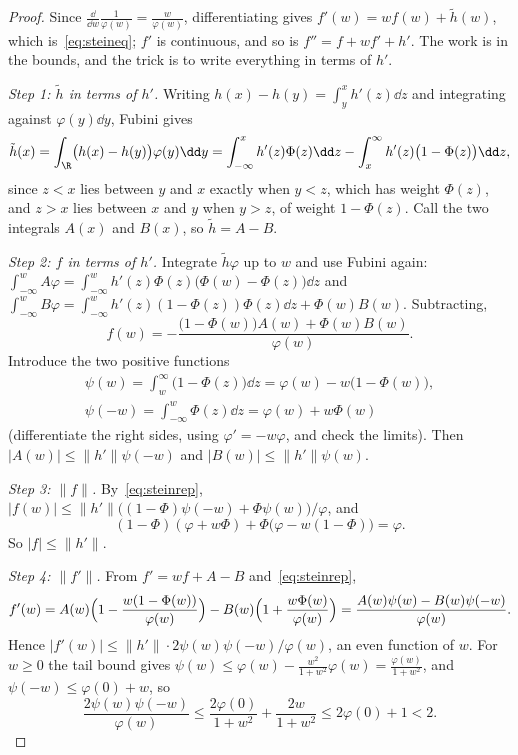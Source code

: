 \begin{proof}
Since $\frac{\dd}{\dd w}\frac1{\varphi(w)}=\frac w{\varphi(w)}$, differentiating gives $f'(w)=wf(w)+\tilde h(w)$, which is~\eqref{eq:steineq}; $f'$ is continuous,
and so is $f''=f+wf'+h'$. The work is in the bounds, and the trick is to write everything in terms of $h'$.

\emph{Step 1: $\tilde h$ in terms of $h'$.} Writing $h(x)-h(y)=\int_y^xh'(z)\dd z$ and integrating against $\varphi(y)\dd y$, Fubini gives
\[
\tilde h(x)=\int_{\R}\bigl(h(x)-h(y)\bigr)\varphi(y)\dd y=\int_{-\infty}^xh'(z)\Phi(z)\dd z-\int_x^\infty h'(z)\bigl(1-\Phi(z)\bigr)\dd z,
\]
since $z<x$ lies between $y$ and $x$ exactly when $y<z$, which has weight $\Phi(z)$, and $z>x$ lies between $x$ and $y$ when $y>z$, of weight $1-\Phi(z)$.
Call the two integrals $A(x)$ and $B(x)$, so $\tilde h=A-B$.

\emph{Step 2: $f$ in terms of $h'$.} Integrate $\tilde h\varphi$ up to $w$ and use Fubini again: $\int_{-\infty}^wA\varphi=\int_{-\infty}^wh'(z)\Phi(z)\bigl(\Phi(w)-\Phi(z)\bigr)\dd z$
and $\int_{-\infty}^wB\varphi=\int_{-\infty}^wh'(z)(1-\Phi(z))\Phi(z)\dd z+\Phi(w)B(w)$. Subtracting,
\begin{equation}\label{eq:steinrep}
f(w)=-\frac{\bigl(1-\Phi(w)\bigr)A(w)+\Phi(w)B(w)}{\varphi(w)}.
\end{equation}
Introduce the two positive functions
\[
\begin{gathered}
\psi(w)=\int_w^\infty\bigl(1-\Phi(z)\bigr)\dd z=\varphi(w)-w\bigl(1-\Phi(w)\bigr),\\\psi(-w)=\int_{-\infty}^w\Phi(z)\dd z=\varphi(w)+w\Phi(w)
\end{gathered}
\]
(differentiate the right sides, using $\varphi'=-w\varphi$, and check the limits). Then $|A(w)|\le\|h'\|\psi(-w)$ and $|B(w)|\le\|h'\|\psi(w)$.

\emph{Step 3: $\|f\|$.} By~\eqref{eq:steinrep}, $|f(w)|\le\|h'\|\bigl((1-\Phi)\psi(-w)+\Phi\psi(w)\bigr)/\varphi$, and
\[
(1-\Phi)(\varphi+w\Phi)+\Phi\bigl(\varphi-w(1-\Phi)\bigr)=\varphi.
\]
So $|f|\le\|h'\|$.

\emph{Step 4: $\|f'\|$.} From $f'=wf+A-B$ and~\eqref{eq:steinrep},
\[
f'(w)=A(w)\Bigl(1-\frac{w(1-\Phi(w))}{\varphi(w)}\Bigr)-B(w)\Bigl(1+\frac{w\Phi(w)}{\varphi(w)}\Bigr)=\frac{A(w)\psi(w)-B(w)\psi(-w)}{\varphi(w)}.
\]
Hence $|f'(w)|\le\|h'\|\cdot2\psi(w)\psi(-w)/\varphi(w)$, an even function of $w$. For $w\ge0$ the tail bound gives
$\psi(w)\le\varphi(w)-\frac{w^2}{1+w^2}\varphi(w)=\frac{\varphi(w)}{1+w^2}$, and $\psi(-w)\le\varphi(0)+w$, so
\[
\frac{2\psi(w)\psi(-w)}{\varphi(w)}\le\frac{2\varphi(0)}{1+w^2}+\frac{2w}{1+w^2}\le2\varphi(0)+1<2.
\]


\end{proof}
